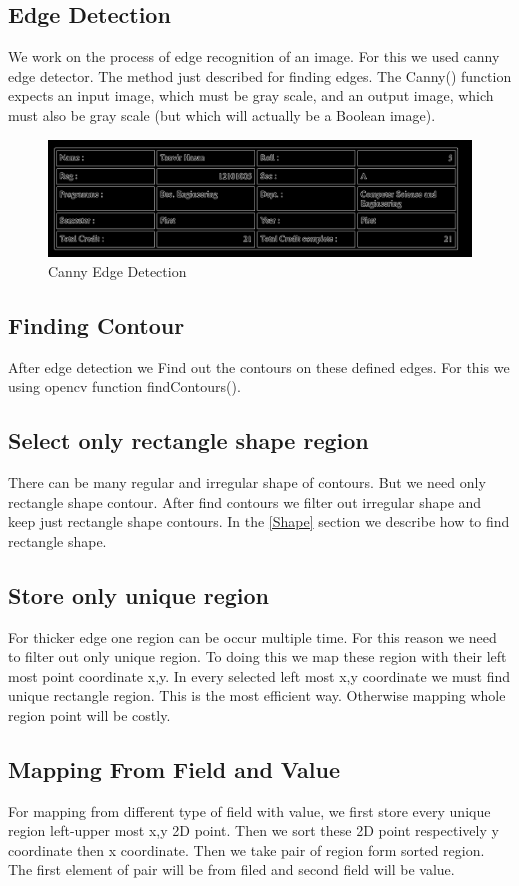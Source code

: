 \subsection{Edge Detection}
We work on the process of edge recognition of an image. For this we used canny edge detector. The method just described for finding edges. The Canny()  function expects an input image, which must be gray scale, and an output image, which must also be gray scale (but which will actually be a Boolean image).\cite{OpenCVBook}
\begin{figure}[h!]
\centering
\includegraphics[width=1\textwidth]{Canny2}
\caption {Canny Edge Detection}
\label {fig:Canny}
\end{figure}
\subsection{Finding Contour}
After edge detection we Find out the contours on these defined edges. For this we using opencv function findContours().
\subsection{Select only rectangle shape region}
There can be many regular and irregular shape of contours. But we need only rectangle shape contour. After find contours we filter out irregular shape and keep just rectangle shape contours. In the \ref{Shape} section we describe how to find rectangle shape.
\subsection{Store only unique region}
For thicker edge one region can be occur multiple time. For this reason we need to filter out only unique region. To doing this we map these region with their left most point coordinate x,y. In every selected left most x,y coordinate we must find unique rectangle region. This is the most efficient way. Otherwise mapping whole region point will be costly.
\subsection{Mapping From Field and Value}
For mapping from different type of field with value, we first store every unique region left-upper most x,y 2D point. Then we sort these 2D point respectively y coordinate then x coordinate. Then we take pair of region form sorted region. The first element of pair will be from filed and second field will be value.
